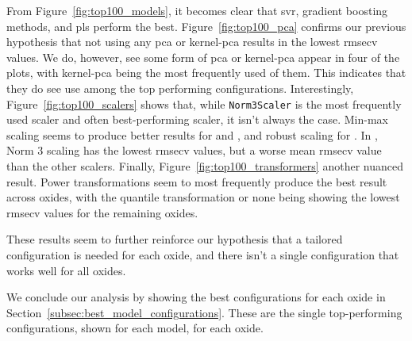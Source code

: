 From Figure~\ref{fig:top100_models}, it becomes clear that \gls{svr}, gradient boosting methods, and \gls{pls} perform the best.
Figure~\ref{fig:top100_pca} confirms our previous hypothesis that not using any \gls{pca} or \gls{kernel-pca} results in the lowest \gls{rmsecv} values.
We do, however, see some form of \gls{pca} or \gls{kernel-pca} appear in four of the plots, with \gls{kernel-pca} being the most frequently used of them.
This indicates that they do see use among the top performing configurations.
Interestingly, Figure~\ref{fig:top100_scalers} shows that, while \texttt{Norm3Scaler} is the most frequently used scaler and often best-performing scaler, it isn't always the case.
Min-max scaling seems to produce better results for  and , and robust scaling for .
In , Norm 3 scaling has the lowest \gls{rmsecv} values, but a worse mean \gls{rmsecv} value than the other scalers.
Finally, Figure~\ref{fig:top100_transformers} another nuanced result.
Power transformations seem to most frequently produce the best result across oxides, with the quantile transformation or none being showing the lowest \gls{rmsecv} values for the remaining oxides.

These results seem to further reinforce our hypothesis that a tailored configuration is needed for each oxide, and there isn't a single configuration that works well for all oxides.



We conclude our analysis by showing the best configurations for each oxide in Section~\ref{subsec:best_model_configurations}.
These are the single top-performing configurations, shown for each model, for each oxide.



